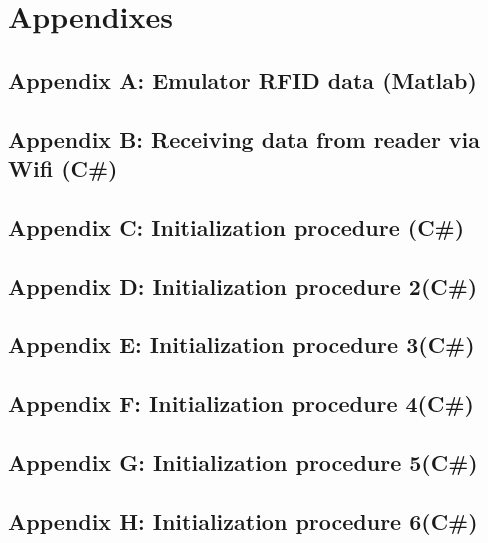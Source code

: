 \section{Appendixes}

\subsection{Appendix A: Emulator RFID data (Matlab)}\label{Sec_AppA}
\scriptsize


\subsection{Appendix B: Receiving data from reader via Wifi (C\#)}\label{Sec_AppB}
\scriptsize


\pagebreak
\subsection{Appendix C: Initialization procedure (C\#)}\label{Sec_AppC}
\scriptsize


\subsection{Appendix D: Initialization procedure 2(C\#)}\label{Sec_AppC}
\scriptsize


\subsection{Appendix E: Initialization procedure 3(C\#)}\label{Sec_AppC}
\scriptsize


\subsection{Appendix F: Initialization procedure 4(C\#)}\label{Sec_AppC}
\scriptsize


\subsection{Appendix G: Initialization procedure 5(C\#)}\label{Sec_AppC}
\scriptsize


\subsection{Appendix H: Initialization procedure 6(C\#)}\label{Sec_AppC}
\scriptsize


